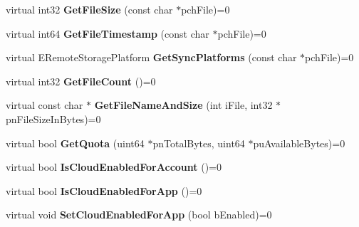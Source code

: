\begin{DoxyCompactItemize}
\mbox{\label{class_i_steam_remote_storage_adad41e06f8b67adc4a3771f6ed56d0db}} 
virtual int32 {\bfseries Get\+File\+Size} (const char $\ast$pch\+File)=0
\item 
\mbox{\label{class_i_steam_remote_storage_abaf3071addc3f08c7e360544b90d4292}} 
virtual int64 {\bfseries Get\+File\+Timestamp} (const char $\ast$pch\+File)=0
\item 
\mbox{\label{class_i_steam_remote_storage_a2e5271c730ebd8622a5c6f0e68eb5899}} 
virtual E\+Remote\+Storage\+Platform {\bfseries Get\+Sync\+Platforms} (const char $\ast$pch\+File)=0
\item 
\mbox{\label{class_i_steam_remote_storage_adcc1532e744ee1c321b1b6e0552547b9}} 
virtual int32 {\bfseries Get\+File\+Count} ()=0
\item 
\mbox{\label{class_i_steam_remote_storage_a956cc237e8982baffab7b9b165cf34b3}} 
virtual const char $\ast$ {\bfseries Get\+File\+Name\+And\+Size} (int i\+File, int32 $\ast$pn\+File\+Size\+In\+Bytes)=0
\item 
\mbox{\label{class_i_steam_remote_storage_a41742237aff0c28801d60daed5f08e7d}} 
virtual bool {\bfseries Get\+Quota} (uint64 $\ast$pn\+Total\+Bytes, uint64 $\ast$pu\+Available\+Bytes)=0
\item 
\mbox{\label{class_i_steam_remote_storage_acde8254bb043a055939e46480d382c81}} 
virtual bool {\bfseries Is\+Cloud\+Enabled\+For\+Account} ()=0
\item 
\mbox{\label{class_i_steam_remote_storage_aaa4f64630a531a5e9579e59a3517ef91}} 
virtual bool {\bfseries Is\+Cloud\+Enabled\+For\+App} ()=0
\item 
\mbox{\label{class_i_steam_remote_storage_aa7b06f83c5a41a8565871d8ef69fb46d}} 
virtual void {\bfseries Set\+Cloud\+Enabled\+For\+App} (bool b\+Enabled)=0
\item 
\mbox{\label{class_i_steam_remote_storage_abe9fc55e988e8f6dff10cc6207550a82}} 

\end{DoxyCompactItemize}
